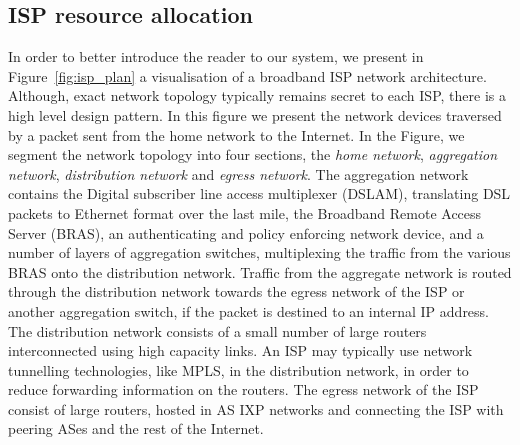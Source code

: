 \subsection{ISP resource allocation} \label{s:qos:motivation}


In order to better introduce the reader to our system, we present in
Figure~\ref{fig:isp_plan} a visualisation of a broadband ISP network
architecture.  Although, exact network topology typically remains secret to each
ISP, there is a high level design pattern. In this figure we present the network
devices traversed by a packet sent from the home network to the Internet.  In
the Figure, we segment the network topology into four sections, the {\it home
  network}, {\it aggregation network}, {\it distribution network} and {\it
  egress network}. The aggregation network contains the Digital subscriber line
access multiplexer (DSLAM), translating DSL packets to Ethernet format over the
last mile,  the Broadband Remote Access Server (BRAS), an authenticating and
policy enforcing network device, and a number of layers of aggregation switches,
multiplexing the traffic from the various BRAS onto the distribution network.
Traffic from the aggregate network is routed through the distribution network
towards the egress network of the ISP or another aggregation switch, if the
packet is destined to an internal IP address. The distribution network consists
of a small number of large routers interconnected using high capacity links. An
ISP may typically use network tunnelling technologies, like MPLS, in the
distribution network, in order to reduce forwarding information on the routers.
The egress network of the ISP consist of large routers, hosted in AS IXP
networks and connecting the ISP with peering ASes and the rest of the Internet.

